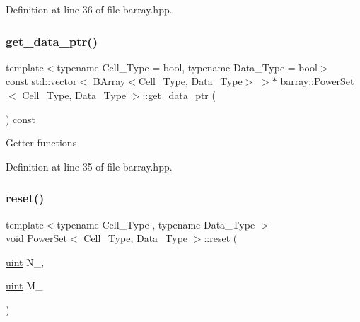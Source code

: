 Definition at line 36 of file barray.\+hpp.

\mbox{\label{classbarray_1_1_power_set_aeca18986c92b68a865b54e0d7a89ea75}} 
\subsubsection{\texorpdfstring{get\+\_\+data\+\_\+ptr()}{get\_data\_ptr()}}
{\footnotesize\ttfamily template$<$typename Cell\+\_\+\+Type  = bool, typename Data\+\_\+\+Type  = bool$>$ \\
const std\+::vector$<$ \hyperlink{classbarray_1_1_b_array}{B\+Array}$<$Cell\+\_\+\+Type, Data\+\_\+\+Type$>$ $>$$\ast$ \hyperlink{classbarray_1_1_power_set}{barray\+::\+Power\+Set}$<$ Cell\+\_\+\+Type, Data\+\_\+\+Type $>$\+::get\+\_\+data\+\_\+ptr (\begin{DoxyParamCaption}{ }\end{DoxyParamCaption}) const\hspace{0.3cm}{\ttfamily [inline]}}

Getter functions 

Definition at line 35 of file barray.\+hpp.

\mbox{\label{classbarray_1_1_power_set_a8074f5a6d44b6b7f6bad56d15576eb9f}} 
\subsubsection{\texorpdfstring{reset()}{reset()}}
{\footnotesize\ttfamily template$<$typename Cell\+\_\+\+Type , typename Data\+\_\+\+Type $>$ \\
void \hyperlink{classbarray_1_1_power_set}{Power\+Set}$<$ Cell\+\_\+\+Type, Data\+\_\+\+Type $>$\+::reset (\begin{DoxyParamCaption}\item[{\hyperlink{namespacebarray_af9756a31953db233f80a9cfe1ef31c32}{uint}}]{N\+\_\+,  }\item[{\hyperlink{namespacebarray_af9756a31953db233f80a9cfe1ef31c32}{uint}}]{M\+\_\+ }\end{DoxyParamCaption})\hspace{0.3cm}{\ttfamily [inline]}}



